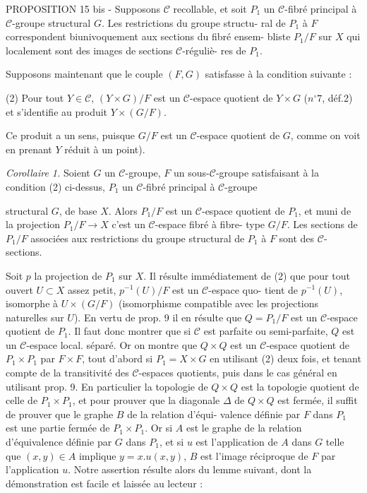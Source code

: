 PROPOSITION 15 bis - Supposons $\mathcal{C}$ recollable, et soit $P_1$ un $\mathcal{C}$-fibré
principal à $\mathcal{C}$-groupe structural $G$. Les restrictions du groupe structu-
ral de $P_1$ à $F$ correspondent biunivoquement aux sections du fibré ensem-
bliste $P_1/F$ sur $X$ qui localement sont des images de sections $\mathcal{C}$-réguliè-
res de $P_1$.

Supposons maintenant que le couple $(F,G)$ satisfasse à la condition
suivante :

(2) Pour tout $Y \in \mathcal{C}$, $(Y \times G)/F$ est un $\mathcal{C}$-espace quotient de $Y \times G$ ($n^\circ 7$,
déf.2) et s'identifie au produit $Y \times (G/F)$.

Ce produit a un sens, puisque $G/F$ est un $\mathcal{C}$-espace quotient de $G$, comme
on voit en prenant $Y$ réduit à un point).

\emph{Corollaire 1.} Soient $G$ un $\mathcal{C}$-groupe, $F$ un sous-$\mathcal{C}$-groupe satisfaisant
à la condition (2) ci-dessus, $P_1$ un $\mathcal{C}$-fibré principal à $\mathcal{C}$-groupe

\newpage


structural $G$, de base $X$. Alors $P_1/F$ est un $\mathcal{C}$-espace quotient de $P_1$,
et muni de la projection $P_1/F \to X$ c'est un $\mathcal{C}$-espace fibré à fibre-
type $G/F$. Les sections de $P_1/F$ associées aux restrictions du groupe
structural de $P_1$ à $F$ sont des $\mathcal{C}$-sections.

Soit $p$ la projection de $P_1$ sur $X$. Il résulte immédiatement de (2)
que pour tout ouvert $U \subset X$ assez petit, $p^{-1}(U)/F$ est un $\mathcal{C}$-espace quo-
tient de $p^{-1}(U)$, isomorphe à $U \times (G/F)$ (isomorphisme compatible avec les
projections naturelles sur $U$). En vertu de prop. 9 il en résulte que
$Q = P_1/F$ est un $\mathcal{C}$-espace quotient de $P_1$. Il faut donc montrer que si
$\mathcal{C}$ est parfaite ou semi-parfaite, $Q$ est un $\mathcal{C}$-espace local. séparé. Or
on montre que $Q \times Q$ est un $\mathcal{C}$-espace quotient de $P_1 \times P_1$ par $F \times F$, tout
d'abord si $P_1 = X \times G$ en utilisant (2) deux fois, et tenant compte de la
transitivité des $\mathcal{C}$-espaces quotients, puis dans le cas général en
utilisant prop. 9. En particulier la topologie de $Q \times Q$ est la topologie
quotient de celle de $P_1 \times P_1$, et pour prouver que la diagonale $\Delta$ de $Q \times Q$
est fermée, il suffit de prouver que le graphe $B$ de la relation d'équi-
valence définie par $F$ dans $P_1$ est une partie fermée de $P_1 \times P_1$. Or si $A$
est le graphe de la relation d'équivalence définie par $G$ dans $P_1$, et si
$u$ est l'application de $A$ dans $G$ telle que $(x,y) \in A$ implique $y = x.u(x,y)$,
$B$ est l'image réciproque de $F$ par l'application $u$. Notre assertion
résulte alors du lemme suivant, dont la démonstration est facile et
laissée au lecteur :

